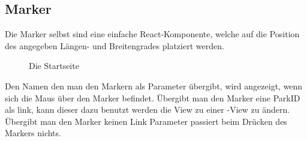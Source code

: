 \subsection{Marker}

Die Marker selbst sind eine einfache React-Komponente, welche auf die Position des angegeben Längen- und
Breitengrades platziert werden. 

\begin{figure}[H]
    \begin{center}
      \caption{Die Startseite}
    \end{center}
\end{figure}

Den Namen den man den Markern als Parameter übergibt, wird angezeigt, wenn sich die Maus über den 
Marker befindet. Übergibt man den Marker eine ParkID als link, kann dieser dazu benutzt werden die 
View zu einer -View zu ändern. Übergibt man den Marker keinen Link Parameter
passiert beim Drücken des Markers nichts.